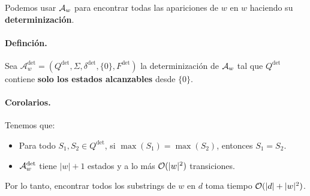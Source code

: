 Podemos usar $\mathcal{A}_w$ para encontrar todas las apariciones de $w$ en $w$ haciendo su \textbf{determinización}. \medbreak

\paragraph{Definción.} Sea $\mathcal{A}_w^{\operatorname{det}}=\left(Q^{\operatorname{det}}, \Sigma, \delta^{\operatorname{det}},\{0\}, F^{\operatorname{det}}\right)$ la determinización de $\mathcal{A}_w$ tal que $Q^\text{det}$ contiene \textbf{solo los estados alcanzables} desde $\{0\}$.



\paragraph{Corolarios.} Tenemos que:
\begin{itemize}
    \item Para todo $S_1,S_2 \in Q^\text{det}$, si $\max(S_1) = \max(S_2)$, entonces $S_1 = S_2$.
    \item $\mathcal{A}_w^\text{det}$ tiene $|w| + 1$ estados y a lo más $\mathcal{O}(|w|^2)$ transiciones.
\end{itemize}

Por lo tanto, encontrar todos los substrings de $w$ en $d$ toma tiempo $\mathcal{O}(|d| + |w|^2)$.

